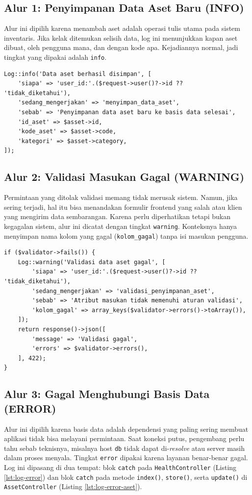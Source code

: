\documentclass[a4paper,oneside,12pt]{report}
\begin{document}
\subsection{Alur 1: Penyimpanan Data Aset Baru (INFO)}
Alur ini dipilih karena menambah aset adalah operasi tulis utama pada sistem inventaris. Jika kelak ditemukan selisih data, log ini menunjukkan kapan aset dibuat, oleh pengguna mana, dan dengan kode apa. Kejadiannya normal, jadi tingkat yang dipakai adalah \texttt{info}.

\begin{lstlisting}[style=phpstyle,caption={Log info pada AssetController::store() setelah aset tersimpan.},label={lst:log-info}]
Log::info('Data aset berhasil disimpan', [
    'siapa' => 'user_id:'.($request->user()?->id ?? 'tidak_diketahui'),
    'sedang_mengerjakan' => 'menyimpan_data_aset',
    'sebab' => 'Penyimpanan data aset baru ke basis data selesai',
    'id_aset' => $asset->id,
    'kode_aset' => $asset->code,
    'kategori' => $asset->category,
]);
\end{lstlisting}

\subsection{Alur 2: Validasi Masukan Gagal (WARNING)}
Permintaan yang ditolak validasi memang tidak merusak sistem. Namun, jika sering terjadi, hal itu bisa menandakan formulir frontend yang salah atau klien yang mengirim data sembarangan. Karena perlu diperhatikan tetapi bukan kegagalan sistem, alur ini dicatat dengan tingkat \texttt{warning}. Konteksnya hanya menyimpan nama kolom yang gagal (\texttt{kolom\_gagal}) tanpa isi masukan pengguna.

\begin{lstlisting}[style=phpstyle,caption={Log warning saat validasi penyimpanan aset gagal.},label={lst:log-warning}]
if ($validator->fails()) {
    Log::warning('Validasi data aset gagal', [
        'siapa' => 'user_id:'.($request->user()?->id ?? 'tidak_diketahui'),
        'sedang_mengerjakan' => 'validasi_penyimpanan_aset',
        'sebab' => 'Atribut masukan tidak memenuhi aturan validasi',
        'kolom_gagal' => array_keys($validator->errors()->toArray()),
    ]);
    return response()->json([
        'message' => 'Validasi gagal',
        'errors' => $validator->errors(),
    ], 422);
}
\end{lstlisting}

\subsection{Alur 3: Gagal Menghubungi Basis Data (ERROR)}
Alur ini dipilih karena basis data adalah dependensi yang paling sering membuat aplikasi tidak bisa melayani permintaan. Saat koneksi putus, pengembang perlu tahu sebab teknisnya, misalnya host \texttt{db} tidak dapat di-\textit{resolve} atau server masih dalam proses menyala. Tingkat \texttt{error} dipakai karena layanan benar-benar gagal. Log ini dipasang di dua tempat: blok \texttt{catch} pada \texttt{HealthController} (Listing \ref{lst:log-error}) dan blok \texttt{catch} pada metode \texttt{index()}, \texttt{store()}, serta \texttt{update()} di \texttt{AssetController} (Listing \ref{lst:log-error-aset}).
\end{document}
